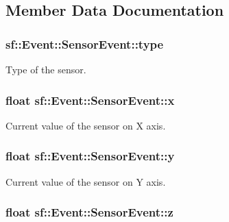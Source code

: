\subsection{Member Data Documentation}
\hypertarget{structsf_1_1_event_1_1_sensor_event_abee7d67bf0947fd1138e4466011e2436}{
\subsubsection[{type}]{ sf\-::\-Event\-::\-Sensor\-Event\-::type}}\label{structsf_1_1_event_1_1_sensor_event_abee7d67bf0947fd1138e4466011e2436}


Type of the sensor. 

\hypertarget{structsf_1_1_event_1_1_sensor_event_aa6ccbd13c181b866a6467462158d93d9}{
\subsubsection[{x}]{\setlength{\rightskip}{0pt plus 5cm}float sf\-::\-Event\-::\-Sensor\-Event\-::x}}\label{structsf_1_1_event_1_1_sensor_event_aa6ccbd13c181b866a6467462158d93d9}


Current value of the sensor on X axis. 

\hypertarget{structsf_1_1_event_1_1_sensor_event_aecafcd25ecb3ba486e42284e4bb69a57}{
\subsubsection[{y}]{\setlength{\rightskip}{0pt plus 5cm}float sf\-::\-Event\-::\-Sensor\-Event\-::y}}\label{structsf_1_1_event_1_1_sensor_event_aecafcd25ecb3ba486e42284e4bb69a57}


Current value of the sensor on Y axis. 

\hypertarget{structsf_1_1_event_1_1_sensor_event_a5704e0d0b82b07f051cc858894f3ea43}{
\subsubsection[{z}]{\setlength{\rightskip}{0pt plus 5cm}float sf\-::\-Event\-::\-Sensor\-Event\-::z}}\label{structsf_1_1_event_1_1_sensor_event_a5704e0d0b82b07f051cc858894f3ea43}


